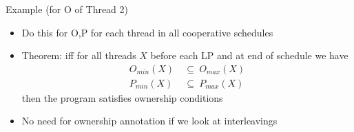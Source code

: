 \documentclass{beamer}
\begin{document}
\begin{frame}
Example (for O of Thread 2)
\begin{center}
\end{center}
\end{frame}

\begin{frame} 
\begin{itemize} 
	\item Do this for O,P for each thread in all cooperative schedules
	\item Theorem: iff for all threads $X$ before each LP and at end of schedule we have 
	\begin{align*}
	O_\mathit{min}(X)\  & \subseteq \ O_\mathit{max}(X) 
	\\
	P_\mathit{min}(X) \ & \subseteq \ P_\mathit{max}(X)
	\end{align*}
	then the program satisfies ownership conditions
	\item No need for ownership annotation if we look at interleavings
\end{itemize}
\end{frame} 
\end{document}
